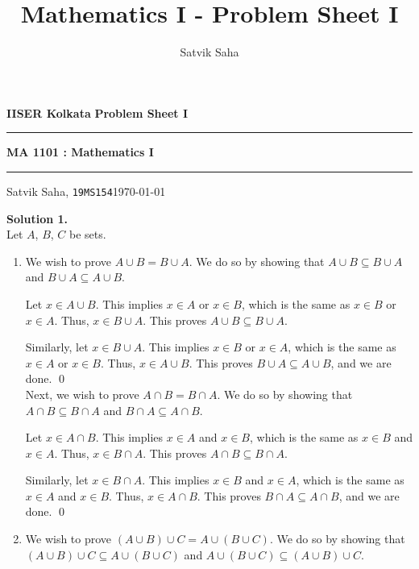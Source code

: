 \documentclass[10pt]{article}
\title{Mathematics I - Problem Sheet I}
\author{Satvik Saha}
\date{}
\begin{document}
        \par\textbf{IISER Kolkata} \hfill \textbf{Problem Sheet I}
        \vspace{3pt}
        \hrule
        \vspace{3pt}
        \begin{center}
                \LARGE{\textbf{MA 1101 : Mathematics I}}
        \end{center}
        \vspace{3pt}
        \hrule
        \vspace{3pt}
        Satvik Saha, \texttt{19MS154}\hfill\today
        \vspace{20pt}

        \textbf{Solution 1.}\\
        Let $A$, $B$, $C$ be sets.
        \begin{enumerate}
                \item
                We wish to prove $A \cup B = B \cup A$. We do so by showing that $A \cup B \subseteq B \cup A$ and
                $B \cup A \subseteq A \cup B$.

                Let $x \in A \cup B$. This implies $x \in A$ or $x \in B$, which is the same as $x \in B$ or $x \in A$.
                Thus, $x \in B \cup A$. This proves $A \cup B \subseteq B \cup A$.
                
                Similarly, let $x \in B \cup A$. This implies $x \in B$ or $x \in A$, which is the same as $x \in A$ or $x \in B$.
                Thus, $x \in A \cup B$. This proves $B \cup A \subseteq A \cup B$, and we are done. \qed \\
                
                Next, we wish to prove $A \cap B = B \cap A$. We do so by showing that $A \cap B \subseteq B \cap A$ and
                $B \cap A \subseteq A \cap B$.
                
                Let $x \in A \cap B$. This implies $x \in A$ and $x \in B$, which is the same as $x \in B$ and $x \in A$.
                Thus, $x \in B \cap A$. This proves $A \cap B \subseteq B \cap A$.
                
                Similarly, let $x \in B \cap A$. This implies $x \in B$ and $x \in A$, which is the same as $x \in A$ and $x \in B$.
                Thus, $x \in A \cap B$. This proves $B \cap A \subseteq A \cap B$, and we are done. \qed


                \item
                We wish to prove $(A \cup B) \cup C = A \cup (B \cup C)$. We do so by showing that $(A \cup B) \cup C \subseteq A \cup (B \cup C)$
                and $A \cup (B \cup C) \subseteq (A \cup B) \cup C$.


\end{enumerate}
\end{document}
